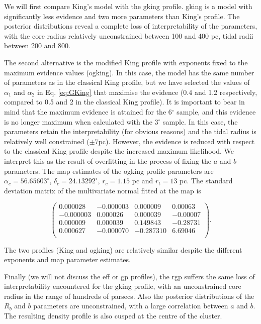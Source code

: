 We will first compare King's model with the \gls{gking} profile. \gls{gking} is a model with significantly less evidence and two more parameters than King's profile. The posterior distributions reveal a complete loss of interpretability of the parameters, with the core radius relatively unconstrained between 100 and 400 pc, tidal radii between 200 and 800. %

The second alternative is the modified King profile with exponents fixed to the maximum evidence values (\gls{ogking}). In this case, the model has the same number of parameters as in the classical King profile, but we have selected the values of $\alpha_1$ and $\alpha_2$ in Eq. \ref{eq:GKing} that maximise the evidence (0.4 and 1.2 respectively, compared to 0.5 and 2 in the classical King profile). It is important to bear in mind that the maximum evidence is attained for the 6$^{\circ}$ sample, and this evidence is no longer maximum when calculated with the 3$^{\circ}$ sample. In this case, the parameters retain the interpretability (for obvious reasons) and the tidal radius is relatively well constrained ($\pm 7$pc). However, the evidence is reduced with respect to the classical King profile despite the increased maximum likelihood. We interpret this as the result of overfitting in the process of fixing the $a$ and $b$ parameters. The \gls{map} estimates of the \gls{ogking} profile parameters are $\alpha_c=56.65603^{\circ}$, $\delta_c=24.13292^{\circ}$, $r_c=1.15$ pc and $r_t=13$ pc. The standard deviation matrix of the multivariate normal fitted at the \gls{map} is 

$$
\left(\begin{array}{rrrr}
 0.000028 &-0.000003 & 0.000009 & 0.00063\\
-0.000003 & 0.000026 & 0.000039 &-0.00007\\
 0.000009 & 0.000039 & 0.149843 &-0.28731\\
 0.000627 &-0.000070 &-0.287310 & 6.69046\\
\end{array}\right).
$$


The two profiles (King and \gls{ogking}) are relatively similar despite the different exponents and \gls{map} parameter estimates. 

Finally (we will not discuss the \gls{eff} or \gls{gp} profiles), the \gls{rgp} suffers the same loss of interpretability encountered for the \gls{gking} profile, with an unconstrained core radius in the range of hundreds of parsecs. Also the posterior distributions of the $R_b$ and $b$ parameters are unconstrained, with a large correlation between $a$ and $b$. The resulting density profile is also cusped at the centre of the cluster. 

